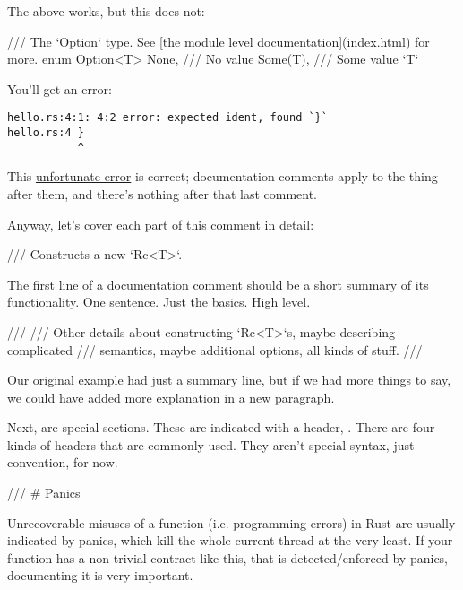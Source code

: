 The above works, but this does not:

\begin{rustc}
/// The `Option` type. See [the module level documentation](index.html) for more.
enum Option<T> {
    None, /// No value
    Some(T), /// Some value `T`
}
\end{rustc}

You'll get an error:

\begin{verbatim}
hello.rs:4:1: 4:2 error: expected ident, found `}`
hello.rs:4 }
           ^
\end{verbatim}

This \href{https://github.com/rust-lang/rust/issues/22547}{unfortunate error} is correct; documentation comments apply to the thing 
after them, and there's nothing after that last comment.


Anyway, let's cover each part of this comment in detail:

\begin{rustc}
/// Constructs a new `Rc<T>`.
\end{rustc}

The first line of a documentation comment should be a short summary of its functionality. One sentence. Just the basics. High level.

\begin{rustc}
///
/// Other details about constructing `Rc<T>`s, maybe describing complicated
/// semantics, maybe additional options, all kinds of stuff.
///
\end{rustc}

Our original example had just a summary line, but if we had more things to say, we could have added more explanation in 
a new paragraph.


Next, are special sections. These are indicated with a header, \code{\#}. There are four kinds of headers that are commonly used. 
They aren't special syntax, just convention, for now.

\begin{rustc}
/// # Panics
\end{rustc}

Unrecoverable misuses of a function (i.e. programming errors) in Rust are usually indicated by panics, which kill the whole 
current thread at the very least. If your function has a non-trivial contract like this, that is detected/enforced by panics, 
documenting it is very important.

